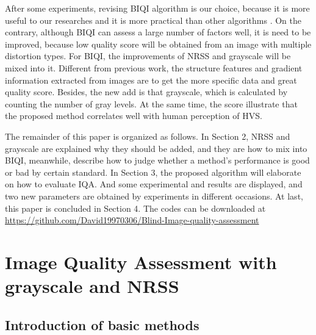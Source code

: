 After some experiments, revising BIQI algorithm is our choice, because it is more useful to our researches and it is more practical than other algorithms \cite{b20,b21,b22,b23}. On the contrary, although BIQI can assess a large number of factors well, it is need to be improved, because low quality score will be obtained from an image with multiple distortion types. For BIQI, the improvements of NRSS and grayscale will be mixed into it. Different from previous work, the structure features and gradient information extracted from images are to get the more specific data and great quality score. Besides, the new add is that grayscale, which is calculated by counting the number of gray levels. At the same time, the score illustrate that the proposed method correlates well with human perception of HVS. 

The remainder of this paper is organized as follows. In Section 2, NRSS and grayscale are explained why they should be added, and they are how to mix into BIQI, meanwhile, describe how to judge whether a method's performance is good or bad by certain standard. In Section 3,  the proposed algorithm will elaborate on how to evaluate IQA. And some experimental and results are displayed, and two new parameters are obtained by experiments in different occasions. At last, this paper is concluded in Section 4. The codes can be downloaded at  \url{https://github.com/David19970306/Blind-Image-quality-assessment}

\section{Image Quality Assessment with grayscale and NRSS}
\subsection{Introduction of basic methods}

